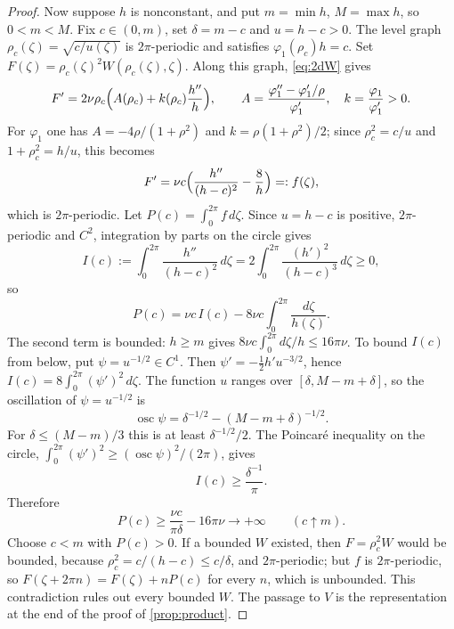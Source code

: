 \documentclass[11pt]{article}
\theoremstyle{definition}
\begin{document}
\begin{proof}
Now suppose $h$ is nonconstant, and put $m=\min h$, $M=\max h$, so
$0<m<M$. Fix $c\in(0,m)$, set $\delta=m-c$ and $u=h-c>0$. The level graph
$\rho_c(\zeta)=\sqrt{c/u(\zeta)}$ is $2\pi$-periodic and satisfies
$\varphi_1(\rho_c)h=c$. Set $F(\zeta)=\rho_c(\zeta)^2W(\rho_c(\zeta),\zeta)$.
Along this graph, \eqref{eq:2dW} gives
\begin{equation}
F'=2\nu\rho_c\Bigl(A(\rho_c)+k(\rho_c)\frac{h''}{h}\Bigr),
\qquad A=\frac{\varphi_1''-\varphi_1'/\rho}{\varphi_1'},\quad
k=\frac{\varphi_1}{\varphi_1'}>0.
\end{equation}
For $\varphi_1$ one has $A=-4\rho/(1+\rho^2)$ and
$k=\rho(1+\rho^2)/2$; since $\rho_c^2=c/u$ and
$1+\rho_c^2=h/u$, this becomes
\begin{equation}\label{eq:periodicF}
F'=\nu c\Bigl(\frac{h''}{(h-c)^2}-\frac8h\Bigr)=:f(\zeta),
\end{equation}
which is $2\pi$-periodic. Let $P(c)=\int_0^{2\pi}f\,d\zeta$. Since $u=h-c$ is
positive, $2\pi$-periodic and $C^2$, integration by parts on the circle gives
\begin{equation}\label{eq:periodicI}
I(c):=\int_0^{2\pi}\frac{h''}{(h-c)^2}\,d\zeta
=2\int_0^{2\pi}\frac{(h')^2}{(h-c)^3}\,d\zeta\ge0,
\end{equation}
so
\begin{equation}
P(c)=\nu c\,I(c)-8\nu c\int_0^{2\pi}\frac{d\zeta}{h(\zeta)}.
\end{equation}
The second term is bounded: $h\ge m$ gives
$8\nu c\int_0^{2\pi}d\zeta/h\le16\pi\nu$. To bound $I(c)$ from below, put
$\psi=u^{-1/2}\in C^1$. Then $\psi'=-\frac12h'u^{-3/2}$, hence
$I(c)=8\int_0^{2\pi}(\psi')^2\,d\zeta$. The function $u$ ranges over
$[\delta,M-m+\delta]$, so the oscillation of $\psi=u^{-1/2}$ is
\begin{equation}
\operatorname{osc}\psi=\delta^{-1/2}-(M-m+\delta)^{-1/2}.
\end{equation}
For $\delta\le(M-m)/3$ this is at least $\delta^{-1/2}/2$. The Poincar\'e
inequality on the circle,
$\int_0^{2\pi}(\psi')^2\ge(\operatorname{osc}\psi)^2/(2\pi)$, gives
\begin{equation}
I(c)\ge\frac{\delta^{-1}}{\pi}.
\end{equation}
Therefore
\begin{equation}
P(c)\ge\frac{\nu c}{\pi\delta}-16\pi\nu\longrightarrow+\infty
\qquad(c\uparrow m).
\end{equation}
Choose $c<m$ with $P(c)>0$. If a bounded $W$ existed, then
$F=\rho_c^2W$ would be bounded, because
$\rho_c^2=c/(h-c)\le c/\delta$, and $2\pi$-periodic; but $f$ is
$2\pi$-periodic, so $F(\zeta+2\pi n)=F(\zeta)+nP(c)$ for every $n$, which is
unbounded. This contradiction rules out every bounded $W$. The passage to $V$
is the representation at the end of the proof of \cref{prop:product}.
\end{proof}
\end{document}
